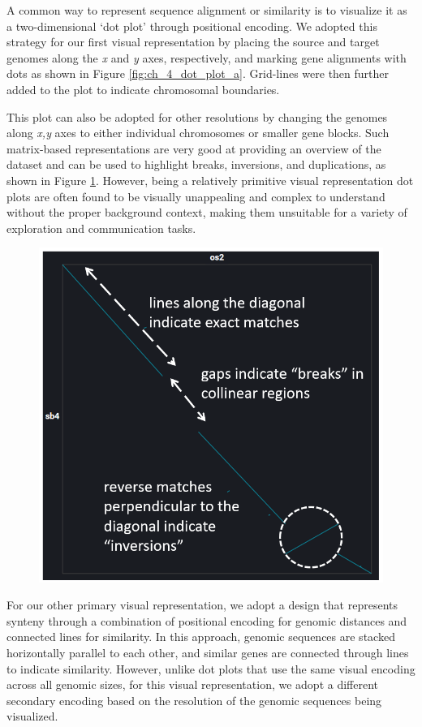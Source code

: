 A common way to represent sequence alignment or similarity is to visualize it as a two-dimensional `dot plot' \cite{SONNHAMMER1995GC1,Cabanettes2018} through positional encoding. We adopted this strategy for our first visual representation by placing the source and target genomes along the \textit{x} and \textit{y} axes, respectively, and marking gene alignments with dots as shown in Figure \ref{fig:ch_4_dot_plot_a}. Grid-lines were then further added to the plot to indicate chromosomal boundaries.



This plot can also be adopted for other resolutions by changing the genomes along \textit{x,y} axes to either individual chromosomes or smaller gene blocks. Such matrix-based representations are very good at providing an overview of the dataset and can be used to highlight breaks, inversions, and duplications, as shown in Figure \ref{fig:ch_4_dot_plot_b}. However, being a relatively primitive visual representation dot plots are often found to be visually unappealing and complex to understand without the proper background context, making them unsuitable for a variety of exploration and communication tasks.


\begin{figure}
  \centering
  \includegraphics[width=.475\linewidth]{images/ch_4_dot_plot_b.PNG}
  \label{fig:ch_4_dot_plot_b}
\end{figure}


For our other primary visual representation, we adopt a design that represents synteny through a combination of positional encoding for genomic distances and connected lines for similarity. In this approach, genomic sequences are stacked horizontally parallel to each other, and similar genes are connected through lines to indicate similarity. However, unlike dot plots that use the same visual encoding across all genomic sizes, for this visual representation, we adopt a different secondary encoding based on the resolution of the genomic sequences being visualized. 

